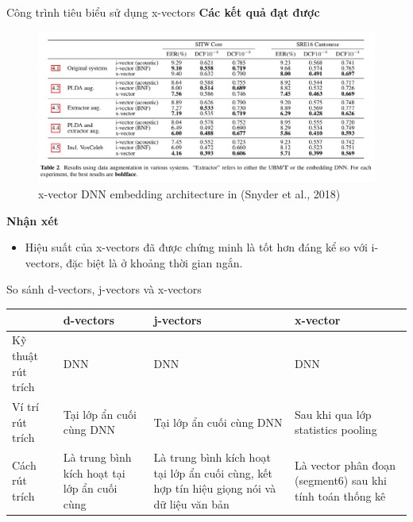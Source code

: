 \documentclass[notheorems, aspectratio=54]{beamer}
\begin{document}
\begin{frame}{Công trình tiêu biểu sử dụng x-vectors}
	\textbf{Các kết quả đạt được}
	\begin{figure}[H]
		\centering
		\includegraphics[width=0.75\linewidth]{images/x-vectors-result-table-02.png}
		\caption{x-vector DNN embedding architecture in (Snyder et al., 2018)}
		\label{fig:writing-thesis}
	\end{figure}
	\textbf{Nhận xét}
	\begin{itemize}
		\item Hiệu suất của x-vectors đã được chứng minh là tốt hơn đáng kể so với i-vectors, đặc biệt là ở khoảng thời gian ngắn.
	\end{itemize}
\end{frame}
\begin{frame}{So sánh d-vectors, j-vectors và x-vectors}
	\begin{table}[H]
		\centering
		\begin{tabular}{ |p{1cm} |p{3cm} | p{3cm} | p{3cm}  |}\hline
			& d-vectors & j-vectors & x-vector \\\hline
			Kỹ thuật rút trích & DNN & DNN & DNN\\ \hline
			Ví trí rút trích & Tại lớp ẩn cuối cùng DNN & Tại lớp ẩn cuối cùng DNN & Sau khi qua lớp statistics pooling\\\hline
			Cách rút trích & Là trung bình kích hoạt tại lớp ẩn cuối cùng & Là trung bình kích hoạt tại lớp ẩn cuối cùng, kết hợp tín hiệu giọng nói và dữ liệu văn bản & Là vector phân đoạn (segment6) sau khi tính toán thống kê\\\hline
		\end{tabular}
	\end{table}
\end{frame}
\end{document}

